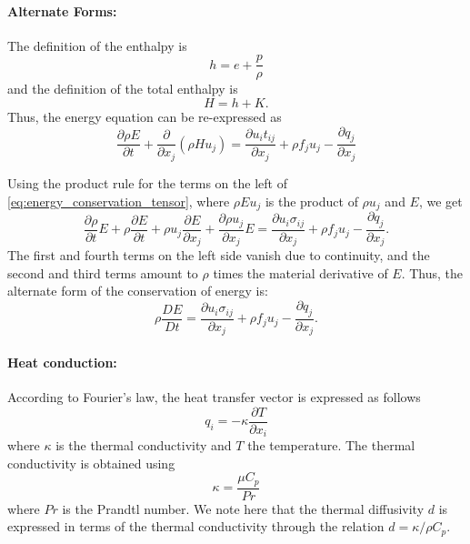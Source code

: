 \documentclass[oneside,a4paper,11pt]{report}
\begin{document}
\paragraph{Alternate Forms:}
The definition of the enthalpy is 
\begin{equation}
    h = e + \frac{p}{\rho}
\end{equation}
and the definition of the total enthalpy is
\begin{equation}
    H = h + K.
\end{equation}
Thus, the energy equation can be re-expressed as
\begin{equation}
\frac{\partial \rho E}{\partial t} + \frac{\partial}{\partial x_j} \left ( \rho H u_j \right ) = \frac{\partial u_i t_{ij}}{\partial x_j} + \rho f_j u_j - \frac{\partial q_j}{\partial x_j}
\end{equation}

Using the product rule for the terms on the left of \cref{eq:energy_conservation_tensor}, where $\rho E u_j$ is the product of $\rho u_j$ and $E$, we get
\begin{equation}
\frac{\partial \rho}{\partial t}E + \rho\frac{\partial E}{\partial t} + \rho u_j\frac{\partial E}{\partial x_j}+\frac{\partial \rho u_j}{\partial x_j}E = \frac{\partial u_i \sigma_{ij}}{\partial x_j} + \rho f_j u_j - \frac{\partial q_j}{\partial x_j}.
\end{equation}
The first and fourth terms on the left side vanish due to continuity, and the second and third terms amount to $\rho$ times the material derivative of $E$. Thus, the alternate form of the conservation of energy is:
\begin{equation}
\label{eq:diff_cons_energy}
\rho\frac{DE}{Dt} = \frac{\partial u_i \sigma_{ij}}{\partial x_j} + \rho f_j u_j - \frac{\partial q_j}{\partial x_j}.
\end{equation}

\paragraph{Heat conduction:}
According to Fourier's law, the heat transfer vector is expressed as follows
\begin{equation} 
\label{eq:heat_conduction}
q_i = -\kappa \frac{\partial T}{\partial x_i}
\end{equation}
where $\kappa$ is the thermal conductivity and $T$ the temperature. The thermal conductivity is obtained using
\begin{equation}
\kappa = \frac{\mu C_p}{Pr}
\end{equation}
where $Pr$ is the Prandtl number. We note here that the thermal diffusivity $d$ is expressed in terms of the thermal conductivity through the relation $d = \kappa/ \rho C_p$. 
\end{document}
